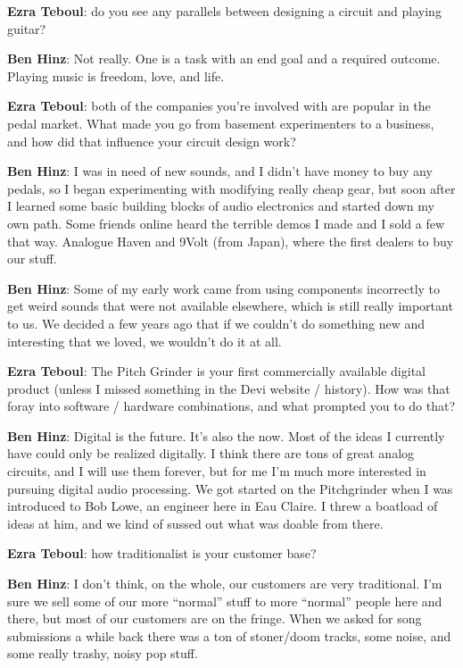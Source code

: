 \textbf{Ezra Teboul}: do you see any parallels between designing a circuit and playing guitar? 

\textbf{Ben Hinz}: Not really. One is a task with an end goal and a required outcome. Playing 
music is freedom, love, and life.

\textbf{Ezra Teboul}: both of the companies you're involved with are popular in the pedal market. What made you go from basement experimenters to a business, and how did that influence your circuit design work? 

\textbf{Ben Hinz}: I was in need of new sounds, and I didn't have money to buy any pedals, 
so I began experimenting with modifying really cheap gear, but soon after I 
learned some basic building blocks of audio electronics and started down my 
own path.  Some friends online heard the terrible demos I made and I sold a few 
that way.  Analogue Haven and 9Volt (from Japan), where the first dealers to buy 
our stuff. 

\textbf{Ben Hinz}: Some of my early work came from using components incorrectly to get  weird sounds that were not available elsewhere, which is still really important to 
us. We decided a few years ago that if we couldn’t do something new and 
interesting that we loved, we wouldn’t do it at all. 

\textbf{Ezra Teboul}: The Pitch Grinder is your first commercially available digital product
(unless I missed something in the Devi website / history). How was
that foray into software / hardware combinations, and what prompted
you to do that? 

\textbf{Ben Hinz}: Digital is the future. It's also the now. Most of the ideas I currently have 
could only be realized digitally. I think there are tons of great analog circuits, and 
I will use them forever, but for me I'm much more interested in pursuing digital 
audio processing. We got started on the Pitchgrinder when I was introduced to 
Bob Lowe, an engineer here in Eau Claire. I threw a boatload of ideas at him, 
and we kind of sussed out what was doable from there.

\textbf{Ezra Teboul}: how traditionalist is your customer base? 

\textbf{Ben Hinz}: I don't think, on the whole, our customers are very traditional. I'm sure we 
sell some of our more ``normal'' stuff to more ``normal'' people here and there, but 
most of our customers are on the fringe. When we asked for song submissions a
while back there was a ton of stoner/doom tracks, some noise, and some really 
trashy, noisy pop stuff.  

